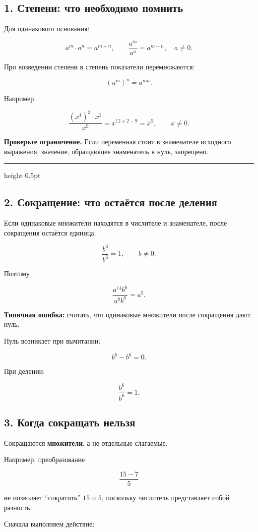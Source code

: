 \documentclass[a4paper,12pt]{article}
\newcommand{\important}[1]{\textbf{\color{darkaccent}#1}}
\newcommand{\ruleline}{%
  \vspace{2mm}
  {\color{accent}\hrule height 0.5pt}
  \vspace{2mm}
}
\begin{document}
\subsection{1. Степени: что необходимо помнить}

Для одинакового основания:

\[
a^m\cdot a^n=a^{m+n},
\qquad
\frac{a^m}{a^n}=a^{m-n},
\quad a\ne0.
\]

При возведении степени в степень показатели перемножаются:

\[
(a^m)^n=a^{mn}.
\]

Например,

\[
\frac{(x^4)^3\cdot x^2}{x^9}
=
x^{12+2-9}
=
x^5,
\qquad x\ne0.
\]

\important{Проверьте ограничение.}
Если переменная стоит в знаменателе исходного выражения, значение, обращающее знаменатель в нуль, запрещено.

\ruleline

\subsection{2. Сокращение: что остаётся после деления}

Если одинаковые множители находятся в числителе и знаменателе, после сокращения остаётся единица:

\[
\frac{b^6}{b^6}=1,
\qquad b\ne0.
\]

Поэтому

\[
\frac{a^{14}b^6}{a^9b^6}
=
a^5.
\]

\important{Типичная ошибка:}
считать, что одинаковые множители после сокращения дают нуль.

Нуль возникает при вычитании:

\[
b^6-b^6=0.
\]

При делении:

\[
\frac{b^6}{b^6}=1.
\]

\subsection{3. Когда сокращать нельзя}

Сокращаются \important{множители}, а не отдельные слагаемые.

Например, преобразование

\[
\frac{15-7}{5}
\]

не позволяет ``сократить'' \(15\) и \(5\), поскольку числитель представляет собой разность.

Сначала выполняем действие:
\end{document}
